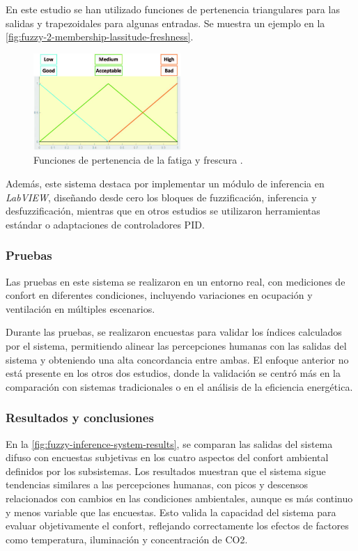 En este estudio se han utilizado funciones de pertenencia triangulares para las salidas y trapezoidales para algunas entradas. Se muestra un ejemplo en la \autoref{fig:fuzzy-2-membership-lassitude-freshness}. 

\begin{figure}[H]
	\centering
	\includegraphics[width=0.5\textwidth]{imgs/fuzzy-2-membership-lassitude-freshness.JPG}
	\caption{Funciones de pertenencia de la fatiga y frescura \parencite{jablonski2018fuzzy}.}
	\label{fig:fuzzy-2-membership-lassitude-freshness}
\end{figure}

Además, este sistema destaca por implementar un módulo de inferencia en \textit{LabVIEW}, diseñando desde cero los bloques de fuzzificación, inferencia y desfuzzificación, mientras que en otros estudios se utilizaron herramientas estándar o adaptaciones de controladores PID.

\subsubsection{Pruebas}

Las pruebas en este sistema se realizaron en un entorno real, con mediciones de confort en diferentes condiciones, incluyendo variaciones en ocupación y ventilación en múltiples escenarios. 

Durante las pruebas, se realizaron encuestas para validar los índices calculados por el sistema, permitiendo alinear las percepciones humanas con las salidas del sistema y obteniendo una alta concordancia entre ambas. El enfoque anterior no está presente en los otros dos estudios, donde la validación se centró más en la comparación con sistemas tradicionales o en el análisis de la eficiencia energética.

\subsubsection{Resultados y conclusiones}

En la \autoref{fig:fuzzy-inference-system-results}, se comparan las salidas del sistema difuso con encuestas subjetivas en los cuatro aspectos del confort ambiental definidos por los subsistemas. Los resultados muestran que el sistema sigue tendencias similares a las percepciones humanas, con picos y descensos relacionados con cambios en las condiciones ambientales, aunque es más continuo y menos variable que las encuestas. Esto valida la capacidad del sistema para evaluar objetivamente el confort, reflejando correctamente los efectos de factores como temperatura, iluminación y concentración de CO2.

